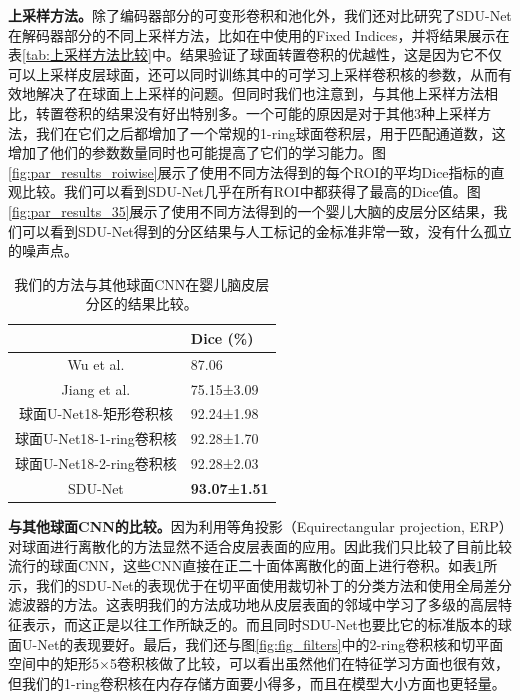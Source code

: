 \textbf{上采样方法。}除了编码器部分的可变形卷积和池化外，我们还对比研究了SDU-Net在解码器部分的不同上采样方法，比如在\cite{jiang2018spherical,parvathaneni2019cortical}中使用的Fixed Indices，并将结果展示在表\ref{tab:上采样方法比较}中。结果验证了球面转置卷积的优越性，这是因为它不仅可以上采样皮层球面，还可以同时训练其中的可学习上采样卷积核的参数，从而有效地解决了在球面上上采样的问题。但同时我们也注意到，与其他上采样方法相比，转置卷积的结果没有好出特别多。一个可能的原因是对于其他3种上采样方法，我们在它们之后都增加了一个常规的1-ring球面卷积层，用于匹配通道数，这增加了他们的参数数量同时也可能提高了它们的学习能力。图\ref{fig:par_results_roiwise}展示了使用不同方法得到的每个ROI的平均Dice指标的直观比较。我们可以看到SDU-Net几乎在所有ROI中都获得了最高的Dice值。图\ref{fig:par_results_35}展示了使用不同方法得到的一个婴儿大脑的皮层分区结果，我们可以看到SDU-Net得到的分区结果与人工标记的金标准非常一致，没有什么孤立的噪声点。


\begin{table}[t]
		\caption{我们的方法与其他球面CNN在婴儿脑皮层分区的结果比较。}
		\label{tab:与其他球面CNNs的比较}
		\centering
		\begin{tabularx}{0.8\linewidth}{c | X<{\centering}}
			\hline
			& Dice (\%)        \\
			\hline
			Wu et al. \cite{wu2018registration}										&   87.06\\
			Jiang et al. \cite{jiang2018spherical, parvathaneni2019cortical}		& 	75.15±3.09		\\
			球面U-Net18-矩形卷积核\cite{seong2018geometric,zhao2018distortion,tateno2018distortion}	& 	92.24±1.98\\
			球面U-Net18-1-ring卷积核 			&   92.28±1.70\\
			球面U-Net18-2-ring卷积核 				    &   92.28±2.03\\
			SDU-Net  											&	\textbf{93.07±1.51} \\
			\hline 
		\end{tabularx}
\end{table}

\textbf{与其他球面CNN的比较。}因为利用等角投影（Equirectangular projection, ERP）对球面进行离散化的方法\cite{s2018spherical,hu2017deep,esteves2018learning}显然不适合皮层表面的应用。因此我们只比较了目前比较流行的球面CNN\cite{wu2018registration,jiang2018spherical,seong2018geometric}，这些CNN直接在正二十面体离散化的面上进行卷积。如表\ref{tab:与其他球面CNNs的比较}所示，我们的SDU-Net的表现优于在切平面使用裁切补丁的分类方法\cite{wu2018registration}和使用全局差分滤波器的方法\cite{jiang2018spherical}。这表明我们的方法成功地从皮层表面的邻域中学习了多级的高层特征表示，而这正是以往工作\cite{wu2018registration,jiang2018spherical}所缺乏的。而且同时SDU-Net也要比它的标准版本的球面U-Net\cite{zhao2019spherical_ipmi}的表现要好。最后，我们还与图\ref{fig:fig_filters}中的2-ring卷积核和切平面空间中的矩形5$\times$5卷积核做了比较，可以看出虽然他们在特征学习方面也很有效，但我们的1-ring卷积核在内存存储方面要小得多，而且在模型大小方面也更轻量。

